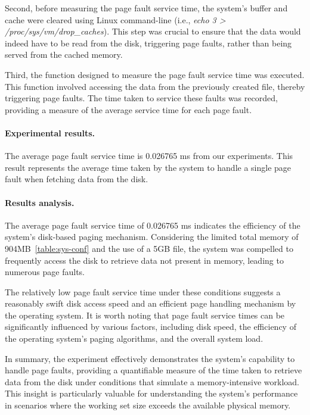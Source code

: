 Second, before measuring the page fault service time, the system's buffer and cache were cleared using Linux command-line (i.e., \emph{echo 3 > /proc/sys/vm/drop\_caches}). This step was crucial to ensure that the data would indeed have to be read from the disk, triggering page faults, rather than being served from the cached memory.

Third, the function designed to measure the page fault service time was executed. This function involved accessing the data from the previously created file, thereby triggering page faults. The time taken to service these faults was recorded, providing a measure of the average service time for each page fault.

\paragraph{Experimental results.}
The average page fault service time is 0.026765 ms from our experiments.
This result represents the average time taken by the system to handle a single page fault when fetching data from the disk.

\paragraph{Results analysis.}
The average page fault service time of 0.026765 ms indicates the efficiency of the system's disk-based paging mechanism. Considering the limited total memory of 904MB~\ref{table:sys-conf} and the use of a 5GB file, the system was compelled to frequently access the disk to retrieve data not present in memory, leading to numerous page faults.

The relatively low page fault service time under these conditions suggests a reasonably swift disk access speed and an efficient page handling mechanism by the operating system. It is worth noting that page fault service times can be significantly influenced by various factors, including disk speed, the efficiency of the operating system's paging algorithms, and the overall system load.

In summary, the experiment effectively demonstrates the system's capability to handle page faults, providing a quantifiable measure of the time taken to retrieve data from the disk under conditions that simulate a memory-intensive workload. This insight is particularly valuable for understanding the system's performance in scenarios where the working set size exceeds the available physical memory.
